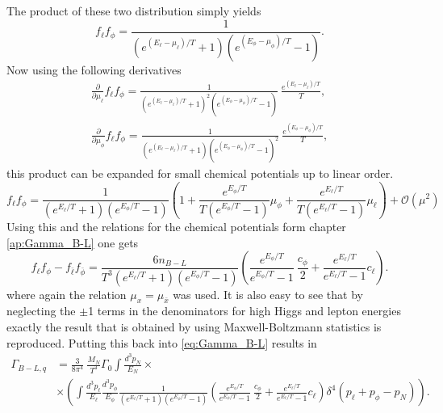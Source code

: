 The product of these two distribution simply yields
\begin{equation*}
	f_\ell f_\phi=\frac{1}{\left(e^{\left(E_\ell-\mu_\ell\right)/T}+1\right)\left(e^{\left(E_\phi-\mu_\phi\right)/T}-1\right)}.
\end{equation*}
Now using the following derivatives
\begin{align*}
	\frac{\partial}{\partial\mu_\ell}f_\ell f_\phi=\frac{1}{\left(e^{\left(E_\ell-\mu_\ell\right)/T}+1\right)^2\left(e^{\left(E_\phi-\mu_\phi\right)/T}-1\right)}\:\frac{e^{\left(E_\ell-\mu_\ell\right)/T}}{T},\\
	\frac{\partial}{\partial\mu_\phi}f_\ell f_\phi=\frac{1}{\left(e^{\left(E_\ell-\mu_\ell\right)/T}+1\right)\left(e^{\left(E_\phi-\mu_\phi\right)/T}-1\right)^2}\:\frac{e^{\left(E_\phi-\mu_\phi\right)/T}}{T},
\end{align*}
this product can be expanded for small chemical potentials up to linear order.
\begin{equation*}
	f_\ell f_\phi=\frac{1}{\left(e^{E_\ell/T}+1\right)\left(e^{E_\phi/T}-1\right)}\left(1+\frac{e^{E_\phi/T}}{T\left(e^{E_\phi/T}-1\right)}\mu_\phi+\frac{e^{E_\ell/T}}{T\left(e^{E_\ell/T}-1\right)}\mu_\ell\right)+\mathcal{O}(\mu^2)
\end{equation*}
Using this and the relations for the chemical potentials form chapter \ref{ap:Gamma_B-L} one gets
\begin{equation*}
	f_\ell f_\phi-f_{\bar{\ell}} f_{\bar{\phi}}=\frac{6n_{B-L}}{T^3\left(e^{E_\ell/T}+1\right)\left(e^{E_\phi/T}-1\right)}\left(\frac{e^{E_\phi/T}}{e^{E_\phi/T}-1}\:\frac{c_\phi}{2}+\frac{e^{E_\ell/T}}{e^{E_\ell/T}-1}c_\ell\right).
\end{equation*}
where again the relation $\mu_x=\mu_{\bar{x}}$ was used. \newline\indent
It is also easy to see that by neglecting the $\pm$1 terms in the denominators for high Higgs and lepton energies exactly the result that is obtained by using Maxwell-Boltzmann statistics is reproduced. \newline\indent
Putting this back into \eqref{eq:Gamma_B-L} results in
\begin{align*}
	\Gamma_{B-L,q}&=\frac{3}{8\pi^4}\:\frac{M_N}{T^3}\Gamma_0\int \frac{d^3p_N}{E_N}\times\\
	&\times\left(\int\frac{d^3p_\ell}{E_\ell}\frac{d^3p_\phi}{E_\phi}\frac{1}{\left(e^{E_\ell/T}+1\right)\left(e^{E_\phi/T}-1\right)}\left(\frac{e^{E_\phi/T}}{e^{E_\phi/T}-1}\:\frac{c_\phi}{2}+\frac{e^{E_\ell/T}}{e^{E_\ell/T}-1}c_\ell\right)\delta^4\left(p_\ell+p_\phi-p_N\right)\right).
\end{align*} 
